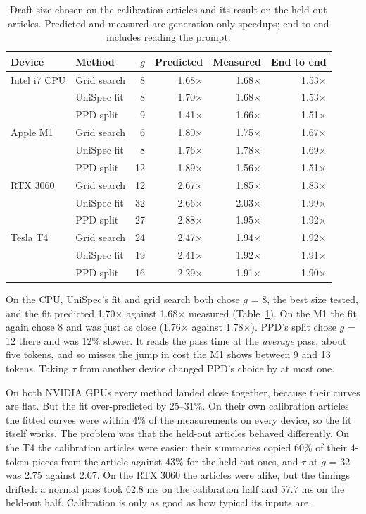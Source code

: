 \documentclass{article}
\newcommand{\tms}{\ensuremath{\times}}
\begin{document}
\begin{table}[t]
\centering
\small
\caption{Draft size chosen on the calibration articles and its result on the held-out articles. Predicted and measured are generation-only speedups; end to end includes reading the prompt.}
\label{tab:calib}
\begin{tabular}{llrrrr}
\toprule
Device & Method & $g$ & Predicted & Measured & End to end \\
\midrule
Intel i7 CPU & Grid search & 8 & 1.68\tms & 1.68\tms & 1.53\tms \\
             & UniSpec fit & 8 & 1.70\tms & 1.68\tms & 1.53\tms \\
             & PPD split   & 9 & 1.41\tms & 1.66\tms & 1.51\tms \\
\midrule
Apple M1     & Grid search & 6 & 1.80\tms & 1.75\tms & 1.67\tms \\
             & UniSpec fit & 8 & 1.76\tms & 1.78\tms & 1.69\tms \\
             & PPD split   & 12 & 1.89\tms & 1.56\tms & 1.51\tms \\
\midrule
RTX 3060     & Grid search & 12 & 2.67\tms & 1.85\tms & 1.83\tms \\
             & UniSpec fit & 32 & 2.66\tms & 2.03\tms & 1.99\tms \\
             & PPD split   & 27 & 2.88\tms & 1.95\tms & 1.92\tms \\
\midrule
Tesla T4     & Grid search & 24 & 2.47\tms & 1.94\tms & 1.92\tms \\
             & UniSpec fit & 19 & 2.41\tms & 1.92\tms & 1.91\tms \\
             & PPD split   & 16 & 2.29\tms & 1.91\tms & 1.90\tms \\
\bottomrule
\end{tabular}
\end{table}

On the CPU, UniSpec's fit and grid search both chose $g$ = 8, the best size tested, and the fit predicted 1.70\tms{} against 1.68\tms{} measured (Table~\ref{tab:calib}).
On the M1 the fit again chose 8 and was just as close (1.76\tms{} against 1.78\tms).
PPD's split chose $g$ = 12 there and was 12\% slower.
It reads the pass time at the \emph{average} pass, about five tokens, and so misses the jump in cost the M1 shows between 9 and 13 tokens.
Taking $\tau$ from another device changed PPD's choice by at most one.

On both NVIDIA GPUs every method landed close together, because their curves are flat.
But the fit over-predicted by 25--31\%.
On their own calibration articles the fitted curves were within 4\% of the measurements on every device, so the fit itself works.
The problem was that the held-out articles behaved differently.
On the T4 the calibration articles were easier: their summaries copied 60\% of their 4-token pieces from the article against 43\% for the held-out ones, and $\tau$ at $g$ = 32 was 2.75 against 2.07.
On the RTX 3060 the articles were alike, but the timings drifted: a normal pass took 62.8 ms on the calibration half and 57.7 ms on the held-out half.
Calibration is only as good as how typical its inputs are.
\end{document}
